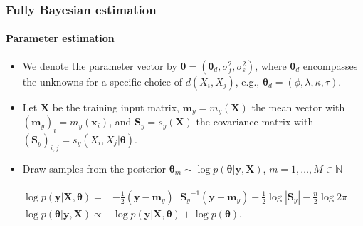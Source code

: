 \documentclass{snedecorbeamer}
\begin{document}
\begin{frame}%
  \label{frm:bayesian-estimation}
  \frametitle{Fully Bayesian estimation}
  \framesubtitle{Parameter estimation}

  \begin{itemize}
  \item We denote the parameter vector by $\bm{\theta} =
    (\bm{\theta}_{d}, \sigma_f^2, \sigma_{\varepsilon}^2)$, where
    $\bm{\theta}_{d}$ encompasses the unknowns for a specific choice of
    $d(X_i, X_j)$, e.g., $\bm{\theta}_{d} = (\phi, \lambda, \kappa, \tau)$.
  \item Let $\mathbf{X}$ be the training input matrix, $\mathbf{m}_y =
    m_y(\mathbf{X})$ the mean vector with %
    ${(\mathbf{m}_y)}_{i} = m_y(\mathbf{x}_i)$, and $\mathbf{S}_y =
    s_y(\mathbf{X})$ the covariance matrix with %
    ${(\mathbf{S}_y)}_{i, j} = s_y(X_i, X_j | {\bm{\theta}})$.
  \item Draw samples from the posterior $\bm{\theta}_m\sim\log p(\bm{\theta} |
    \mathbf{y}, \mathbf{X})$, $m = 1, \dots, M\in\mathbb{N}$
  \end{itemize}
  \begin{align}
    \label{eq:margina-likelihood}
    \log p(\mathbf{y} | \mathbf{X}, \bm{\theta})
    =& -\frac{1}{2}
       {(\mathbf{y} - \mathbf{m}_y)}^\top
       {\mathbf{S}_y}^{-1}
       {(\mathbf{y} - \mathbf{m}_y)}
       -\frac{1}{2}
       \log | \mathbf{S}_y |
       - \frac{n}{2} \log 2\pi \\
    \label{eq:parameter-posterior}
    \log p(\bm{\theta} | \mathbf{y}, \mathbf{X})
    \propto&
             \log p(\mathbf{y} | \mathbf{X}, \bm{\theta}) +
             \log p(\bm{\theta}).
  \end{align}

\end{frame}
\end{document}
